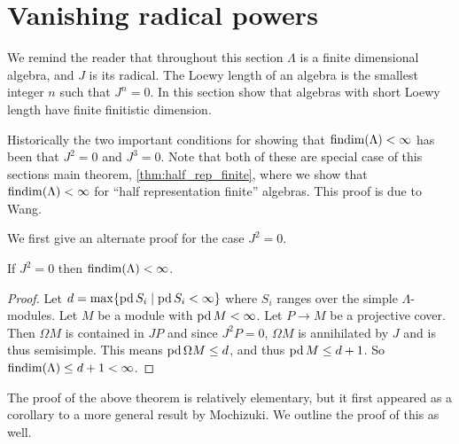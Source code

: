 \section{Vanishing radical powers}\label{sec:vanishing_radical}

We remind the reader that throughout this section $\Lambda$ is a finite dimensional algebra, and $J$ is its radical. The Loewy length of an algebra is the smallest integer $n$ such that $J^n = 0$. In this section show that algebras with short Loewy length have finite finitistic dimension.

Historically the two important conditions for showing that $\operatorname{findim}(\Lambda) < \infty$ has been that $J^2=0$ and $J^3=0$. Note that both of these are special case of this sections main theorem, \cref{thm:half_rep_finite}, where we show that $\operatorname{findim}(\Lambda) < \infty$ for ``half representation finite'' algebras. This proof is due to Wang\cite{Wang94}.

We first give an alternate proof for the case $J^2=0$.

\begin{theorem}\label{thm:J2_equals_0_implies_FDC}
	If $J^2=0$ then $\operatorname{findim}(\Lambda) < \infty$.
	\begin{proof}
		Let $d = \max\{\operatorname{pd} S_i \mid \operatorname{pd} S_i < \infty\}$ where $S_i$ ranges over the simple $\Lambda$-modules. Let $M$ be a module with $\operatorname{pd} M < \infty$. Let $P \to M$ be a projective cover. Then $\Omega M$ is contained in $JP$ and since $J^2P=0$, $\Omega M$ is annihilated by $J$ and is thus semisimple. This means $\operatorname{pd} \Omega M \leq d$, and thus $\operatorname{pd} M \leq d+1$. So $\operatorname{findim}(\Lambda) \leq d+1 < \infty$.
	\end{proof}
\end{theorem}

The proof of the above theorem is relatively elementary, but it first appeared as a corollary to a more general result by Mochizuki\cite{Moc65}. We outline the proof of this as well.

